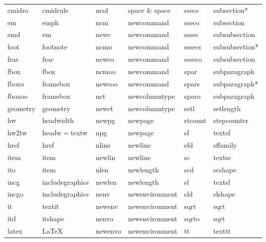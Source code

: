 \documentclass[letterpaper,11pt]{article}
\begin{document}
\begin{table}[H]
{\begin{tabular}{llllll}
cmidro           & cmidrule          & ncol       & space \& space & ssecs           & subsection* \\
em               & emph              & ncm        & newcommand     & sseco           & subsection \\ 
emd              & em                & newc       & newcommand     & sssec           & subsubsection \\
foot             & footnote          & ncmo       & newcommand     & sssecs          & subsubsection* \\
frac             & frac              & newco      & newcommand     & ssseco          & subsubsection \\
fbox             & fbox              & ncmoo      & newcommand     & spar            & subparagraph \\
fboxo            & framebox          & newcoo     & newcommand     & spars           & subparagraph* \\
fboxoo           & framebox          & nct        & newcolumntype  & sparo           & subparagraph \\
geometry         & geometry          & newct      & newcolumntype  & setl            & setlength \\
hw               & headwidth         & newpg      & newpage        & stcount         & stepcounter \\
hw2tw            & headw\(=\)textw   & npg        & newpage        & sf              & textsf \\
href             & href              & nline      & newline        & sfd             & sffamily \\
item             & item              & newlin     & newline        & sc              & textsc \\
ito              & item              & nlen       & newlength      & scd             & scshape \\
incg             & includegraphics   & newlen     & newlength      & sl              & textsl \\
incgo            & includegraphics   & nenv       & newenvironment & sld             & slshape \\
it               & textit            & newenv     & newenvironment & sqrt            & sqrt \\
itd              & itshape           & nenvo      & newenvironment & sqrto           & sqrt \\
latex            & LaTeX             & newenvo    & newenvironment & tt              & texttt \\

\end{tabular}}
\end{table}
\end{document}
